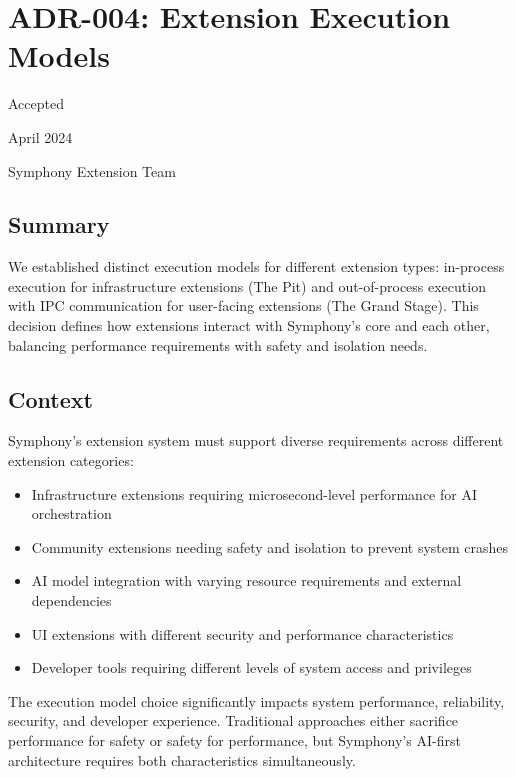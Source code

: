 \section*{ADR-004: Extension Execution Models}

\begin{description}[leftmargin=3cm,labelwidth=2.5cm]
\item[\textbf{Status}] Accepted
\item[\textbf{Date}] April 2024
\item[\textbf{Authors}] Symphony Extension Team
\end{description}

\subsection*{Summary}

We established distinct execution models for different extension types: in-process execution for infrastructure extensions (The Pit) and out-of-process execution with IPC communication for user-facing extensions (The Grand Stage). This decision defines how extensions interact with Symphony's core and each other, balancing performance requirements with safety and isolation needs.

\subsection*{Context}

Symphony's extension system must support diverse requirements across different extension categories:

\begin{itemize}
\item Infrastructure extensions requiring microsecond-level performance for AI orchestration
\item Community extensions needing safety and isolation to prevent system crashes
\item AI model integration with varying resource requirements and external dependencies
\item UI extensions with different security and performance characteristics
\item Developer tools requiring different levels of system access and privileges
\end{itemize}

The execution model choice significantly impacts system performance, reliability, security, and developer experience. Traditional approaches either sacrifice performance for safety or safety for performance, but Symphony's AI-first architecture requires both characteristics simultaneously.

